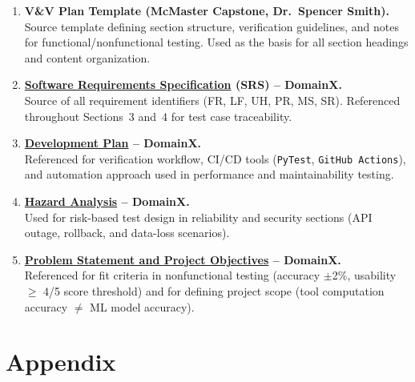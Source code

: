 \documentclass[12pt, titlepage]{article}
\begin{document}
\begin{enumerate}
  \item \textbf{V\&V Plan Template (McMaster Capstone, Dr.\ Spencer Smith).}\\
  Source template defining section structure, verification guidelines, and notes
  for functional/nonfunctional testing. Used as the basis for all section
  headings and content organization.

  \item \textbf{\href{https://github.com/thaafei/DomainX/blob/main/docs/SRS/SRS.pdf}{Software Requirements Specification} (SRS) -- DomainX.}\\
  Source of all requirement identifiers (FR, LF, UH, PR, MS, SR). Referenced
  throughout Sections~3 and~4 for test case traceability.

  \item \textbf{\href{https://github.com/thaafei/DomainX/blob/main/docs/DevelopmentPlan/DevelopmentPlan.pdf}{Development Plan} -- DomainX.}\\
  Referenced for verification workflow, CI/CD tools (\texttt{PyTest},
  \texttt{GitHub Actions}), and automation approach used in performance and
  maintainability testing.

  \item \textbf{\href{https://github.com/thaafei/DomainX/blob/main/docs/HazardAnalysis/HazardAnalysis.pdf}{Hazard Analysis} -- DomainX.}\\
  Used for risk-based test design in reliability and security sections (API
  outage, rollback, and data-loss scenarios).

  \item \textbf{\href{https://github.com/thaafei/DomainX/blob/main/docs/ProblemStatementAndGoals/ProblemStatement.pdf}{Problem Statement and Project Objectives} -- DomainX.}\\
  Referenced for fit criteria in nonfunctional testing (accuracy $\pm$2\%,
  usability $\geq$ 4/5 score threshold) and for defining project scope
  (tool computation accuracy $\neq$ ML model accuracy).
\end{enumerate}

% 

% 

\newpage

\section{Appendix}
\end{document}
